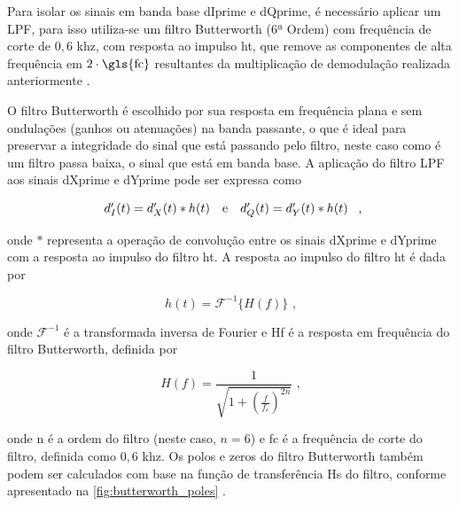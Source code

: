Para isolar os sinais em banda base \gls{dIprime} e \gls{dQprime}, é necessário aplicar um \gls{LPF}, para isso utiliza-se um filtro Butterworth (6ª Ordem) com frequência de corte de $0{,}6$ \gls{khz}, com resposta ao impulso \gls{ht}, que remove as componentes de alta frequência em $2 \cdot \text{\gls{fc}}$ resultantes da multiplicação de demodulação realizada anteriormente \cite{rodrigues_demodulador_2018}.

O filtro Butterworth é escolhido por sua resposta em frequência plana e sem ondulações (ganhos ou atenuações) na banda passante, o que é ideal para preservar a integridade do sinal que está passando pelo filtro, neste caso como é um filtro passa baixa, o sinal que está em banda base. A aplicação do filtro \gls{LPF} aos sinais \gls{dXprime} e \gls{dYprime} pode ser expressa como

\vspace{-1em}
\begin{equation}
    \begin{array}{c@{\quad\text{e}\quad}c}
        d_I'(t) = d_X'(t) * h(t) &
        d_Q'(t) = d_Y'(t) * h(t)
    \end{array} \text{ ,}
\end{equation}

\noindent onde $*$ representa a operação de convolução entre os sinais \gls{dXprime} e \gls{dYprime} com a resposta ao impulso do filtro \gls{ht}. A resposta ao impulso do filtro \gls{ht} é dada por

\vspace{-1em}
\begin{equation}
    h(t) = \mathcal{F}^{-1}\{H(f)\} \text{ ,}
\end{equation}

\noindent onde $\mathcal{F}^{-1}$ é a transformada inversa de Fourier e \gls{Hf} é a resposta em frequência do filtro Butterworth, definida por

\vspace{-1em}
\begin{equation}
    H(f) = \frac{1}{\sqrt{1 + \left(\frac{f}{f_c}\right)^{2n}}} \text{ ,}
\end{equation}

\noindent onde \gls{n} é a ordem do filtro (neste caso, $n=6$) e \gls{fc} é a frequência de corte do filtro, definida como $0,6$ \gls{khz}. Os polos e zeros do filtro Butterworth também podem ser calculados com base na função de transferência \gls{Hs} do filtro, conforme apresentado na \autoref{fig:butterworth_poles} \cite{10555531840}.

